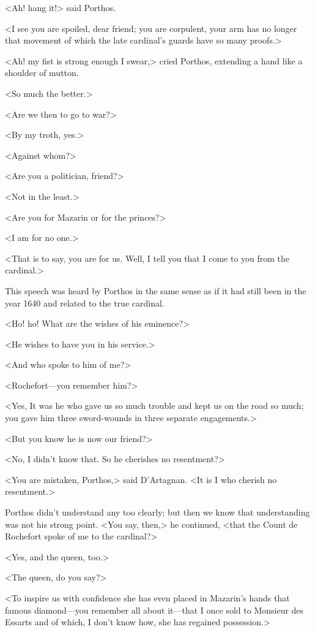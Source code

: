 <Ah! hang it!> said Porthos.

<I see you are spoiled, dear friend; you are corpulent, your arm has no longer that movement of which the late cardinal's guards have so many proofs.>

<Ah! my fist is strong enough I swear,> cried Porthos, extending a hand like a shoulder of mutton.

<So much the better.>

<Are we then to go to war?>

<By my troth, yes.>

<Against whom?>

<Are you a politician, friend?>

<Not in the least.>

<Are you for Mazarin or for the princes?>

<I am for no one.>

<That is to say, you are for us. Well, I tell you that I come to you from the cardinal.>

This speech was heard by Porthos in the same sense as if it had still been in the year 1640 and related to the true cardinal.

<Ho! ho! What are the wishes of his eminence?>

<He wishes to have you in his service.>

<And who spoke to him of me?>

<Rochefort—you remember him?>

<Yes,  It was he who gave us so much trouble and kept us on the road so much; you gave him three sword-wounds in three separate engagements.>

<But you know he is now our friend?>

<No, I didn't know that. So he cherishes no resentment?>

<You are mistaken, Porthos,> said D'Artagnan. <It is I who cherish no resentment.>

Porthos didn't understand any too clearly; but then we know that understanding was not his strong point. <You say, then,> he continued, <that the Count de Rochefort spoke of me to the cardinal?>

<Yes, and the queen, too.>

<The queen, do you say?>

<To inspire us with confidence she has even placed in Mazarin's hands that famous diamond—you remember all about it—that I once sold to Monsieur des Essarts and of which, I don't know how, she has regained possession.>

